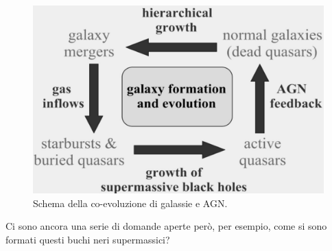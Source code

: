 \begin{figure}
    \centering
    \includegraphics[width = 0.6 \textwidth]{immagini/coevolution-galassie-agn.png}
    \caption{Schema della co-evoluzione di galassie e AGN.}
    \label{fig:coevolution-galassie-agn}
\end{figure}

Ci sono ancora una serie di domande aperte però, per esempio, come si sono formati questi buchi neri supermassici?